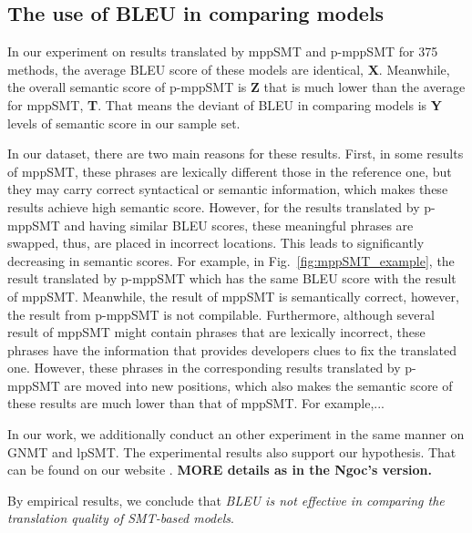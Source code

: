\subsection{The use of BLEU in comparing models}

In our experiment on results translated by mppSMT and p-mppSMT for 375 methods, 
the average BLEU score of these models are identical, \textbf{X}. Meanwhile, 
the overall semantic score of p-mppSMT is \textbf{Z} that is much lower than the 
average for mppSMT, \textbf{T}. That means the deviant of BLEU in comparing 
models is \textbf{Y} levels of semantic score in our sample set. 

In our dataset, there are two main reasons for these results. First,
in some results of mppSMT, these phrases are lexically different those
in the reference one, but they may carry correct syntactical or
semantic information, which makes these results achieve high semantic
score. However, for the results translated by p-mppSMT and having
similar BLEU scores, these meaningful phrases are swapped, thus, are
placed in incorrect locations. This leads to significantly decreasing
in semantic scores. For example, in Fig.~\ref{fig:mppSMT_example}, the
result translated by p-mppSMT which has the same BLEU score with the
result of mppSMT. Meanwhile, the result of mppSMT is semantically
correct, however, the result from p-mppSMT is not compilable.
%
Furthermore, although several result of mppSMT might contain phrases
that are lexically incorrect, these phrases have the information that
provides developers clues to fix the translated one. However, these
phrases in the corresponding results translated by p-mppSMT are moved
into new positions, which also makes the semantic score of these
results are much lower than that of mppSMT. For example,...

In our work, we additionally conduct an other experiment in the same
manner on GNMT and lpSMT.  The experimental results also support our
hypothesis. That can be found on our website \cite{??}. {\bf MORE
  details as in the Ngoc's version.}

By empirical results, we conclude that \textit{BLEU is not effective
  in comparing the translation quality of SMT-based models}.



